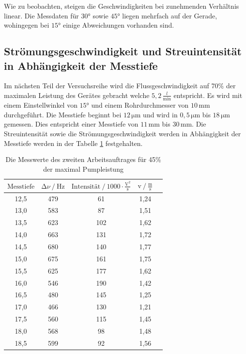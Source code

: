 \begin{flushleft}
    Wie zu beobachten, steigen die Geschwindigkeiten bei zunehmenden Verhältnis linear.
    Die Messdaten für $30\unit{\degree}$ sowie $45\unit{\degree}$ liegen mehrfach auf der Gerade, wohingegen bei $15\unit{\degree}$ einige Abweichungen vorhanden sind.
\end{flushleft}

\subsection{Strömungsgeschwindigkeit und Streuintensität in Abhängigkeit der Messtiefe}

\begin{flushleft}
    Im nächsten Teil der Versuchsreihe wird die Flussgeschwindigkeit auf 70\% der maximalen Leistung des Gerätes gebracht welche $5,2\,\frac{l}{\text{min}}$ entspricht.
    Es wird mit einem Einstellwinkel von $15\unit{\degree}$ und einem Rohrdurchmesser von $10\,\unit{\milli\meter}$ durchgeführt.
    Die Messtiefe beginnt bei $12\,\unit{\micro\meter}$ und wird in $0,5\,\unit{\micro\meter}$ bis $18\,\unit{\micro\meter}$ gemessen.
    Dies entspricht einer Messtiefe von $11\,\unit{\milli\meter}$ bis $30\,\unit{\milli\meter}$.
    Die Streuintensität sowie die Strömungsgeschwindigkeit werden in Abhängigkeit der Messtiefe werden in der Tabelle \ref{Tabelle6} festgehalten.
\end{flushleft}

\begin{table}[H]
    \centering
    \caption{Die Messwerte des zweiten Arbeitsauftrages für 45\% der maximal Pumpleistung} 
    \label{Tabelle6}
    \begin{tabular} {c  c  c  c  c}
        \toprule
        {$ \text{Messtiefe} $} &
        {$ \increment \nu \mathbin{/} \unit{\hertz} $} &
        {$ \text{Intensität} \mathbin{/} 1000 \cdot \frac{\text{V}^2}{\unit{\second}} $} &
        {$ \text{v} \mathbin{/} \frac{\text{m}}{\text{s}} $} \\
        \midrule
        12,5 & 479 & 61   & 1,24 \\
        13,0 & 583 & 87   & 1,51 \\
        13,5 & 623 & 102  & 1,62 \\
        14,0 & 663 & 131  & 1,72 \\
        14,5 & 680 & 140  & 1,77 \\
        15,0 & 675 & 161  & 1,75 \\
        15,5 & 625 & 177  & 1,62 \\
        16,0 & 546 & 190  & 1,42 \\
        16,5 & 480 & 145  & 1,25 \\
        17,0 & 466 & 130  & 1,21 \\
        17,5 & 560 & 115  & 1,45 \\
        18,0 & 568 & 98   & 1,48 \\
        18,5 & 599 & 92   & 1,56 \\
        \bottomrule
    \end{tabular} 
\end{table}




